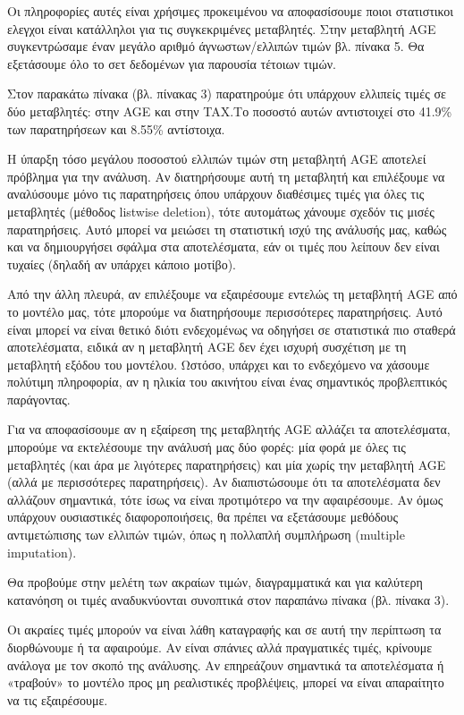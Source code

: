 \documentclass[
  10pt,
]{article}
\begin{document}
Οι πληροφορίες αυτές είναι χρήσιμες προκειμένου να αποφασίσουμε ποιοι
στατιστικοι ελεγχοι είναι κατάλληλοι για τις συγκεκριμένες μεταβλητές.
Στην μεταβλητή AGE συγκεντρώσαμε έναν μεγάλο αριθμό άγνωστων/ελλιπών
τιμών βλ. πίνακα 5. Θα εξετάσουμε όλο το σετ δεδομένων για παρουσία
τέτοιων τιμών.

Στον παρακάτω πίνακα (βλ. πίνακας 3) παρατηρούμε ότι υπάρχουν ελλιπείς
τιμές σε δύο μεταβλητές: στην AGE και στην TAX.Το ποσοστό αυτών
αντιστοιχεί στο 41.9\% των παρατηρήσεων και 8.55\% αντίστοιχα.

Η ύπαρξη τόσο μεγάλου ποσοστού ελλιπών τιμών στη μεταβλητή AGE αποτελεί
πρόβλημα για την ανάλυση. Αν διατηρήσουμε αυτή τη μεταβλητή και
επιλέξουμε να αναλύσουμε μόνο τις παρατηρήσεις όπου υπάρχουν διαθέσιμες
τιμές για όλες τις μεταβλητές (μέθοδος listwise deletion), τότε
αυτομάτως χάνουμε σχεδόν τις μισές παρατηρήσεις. Αυτό μπορεί να μειώσει
τη στατιστική ισχύ της ανάλυσής μας, καθώς και να δημιουργήσει σφάλμα
στα αποτελέσματα, εάν οι τιμές που λείπουν δεν είναι τυχαίες (δηλαδή αν
υπάρχει κάποιο μοτίβο).

Από την άλλη πλευρά, αν επιλέξουμε να εξαιρέσουμε εντελώς τη μεταβλητή
AGE από το μοντέλο μας, τότε μπορούμε να διατηρήσουμε περισσότερες
παρατηρήσεις. Αυτό είναι μπορεί να είναι θετικό διότι ενδεχομένως να
οδηγήσει σε στατιστικά πιο σταθερά αποτελέσματα, ειδικά αν η μεταβλητή
AGE δεν έχει ισχυρή συσχέτιση με τη μεταβλητή εξόδου του μοντέλου.
Ωστόσο, υπάρχει και το ενδεχόμενο να χάσουμε πολύτιμη πληροφορία, αν η
ηλικία του ακινήτου είναι ένας σημαντικός προβλεπτικός παράγοντας.

Για να αποφασίσουμε αν η εξαίρεση της μεταβλητής AGE αλλάζει τα
αποτελέσματα, μπορούμε να εκτελέσουμε την ανάλυσή μας δύο φορές: μία
φορά με όλες τις μεταβλητές (και άρα με λιγότερες παρατηρήσεις) και μία
χωρίς την μεταβλητή AGE (αλλά με περισσότερες παρατηρήσεις). Αν
διαπιστώσουμε ότι τα αποτελέσματα δεν αλλάζουν σημαντικά, τότε ίσως να
είναι προτιμότερο να την αφαιρέσουμε. Αν όμως υπάρχουν ουσιαστικές
διαφοροποιήσεις, θα πρέπει να εξετάσουμε μεθόδους αντιμετώπισης των
ελλιπών τιμών, όπως η πολλαπλή συμπλήρωση (multiple imputation).

Θα προβούμε στην μελέτη των ακραίων τιμών, διαγραμματικά και για
καλύτερη κατανόηση οι τιμές αναδυκνύονται συνοπτικά στον παραπάνω πίνακα
(βλ. πίνακα 3).

Οι ακραίες τιμές μπορούν να είναι λάθη καταγραφής και σε αυτή την
περίπτωση τα διορθώνουμε ή τα αφαιρούμε. Αν είναι σπάνιες αλλά
πραγματικές τιμές, κρίνουμε ανάλογα με τον σκοπό της ανάλυσης. Αν
επηρεάζουν σημαντικά τα αποτελέσματα ή «τραβούν» το μοντέλο προς μη
ρεαλιστικές προβλέψεις, μπορεί να είναι απαραίτητο να τις εξαιρέσουμε.
\end{document}
